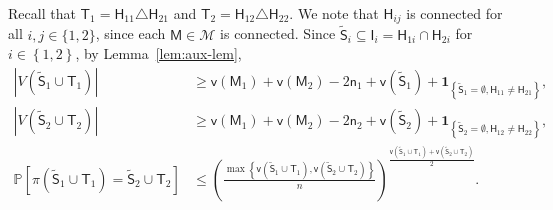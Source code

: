 \documentclass[letterpaper,11pt]{article}
\theoremstyle{definition}
\newcommand{\maM}{\mathcal{M}}
\newcommand{\prob}[1]{ \mathbb{P}\left[ #1 \right] }
\newcommand{\vn}{\mathsf{{v}}}
\newcommand{\pth}[1]{\left( #1 \right)}
\newcommand{\sth}[1]{\left\{ #1 \right\}}
\newcommand{\ti}{\tilde}
\newcommand{\sfH}{{\mathsf{H}}}
\newcommand{\sfI}{{\mathsf{I}}}
\newcommand{\sfM}{{\mathsf{M}}}
\newcommand{\sfS}{{\mathsf{S}}}
\newcommand{\sfT}{{\mathsf{T}}}
\newcommand{\sfn}{{\mathsf{n}}}
\newcommand{\indc}[1]{{\mathbf{1}_{\left\{{#1}\right\}}}}
\begin{document}
Recall that $\sfT_1 = \sfH_{11}\triangle \sfH_{21}$ and $\sfT_2 = \sfH_{12}\triangle \sfH_{22}$. 
We note that $\sfH_{ij}$ is connected for all $i,j \in \{1,2\}$, since each $\sfM \in \maM$ is connected.
Since $\ti{\sfS}_i\subseteq \sfI_i = \sfH_{1i}\cap \sfH_{2i}$ for $i\in \sth{1,2}$, by Lemma~\ref{lem:aux-lem},\begin{align*}
    |V(\ti{\sfS}_1\cup \sfT_1)|&\ge \vn(\sfM_1)+\vn(\sfM_2) -2\sfn_1+\vn(\ti{\sfS}_1)+\indc{\ti{\sfS}_1=\emptyset, \sfH_{11}\neq \sfH_{21}},\\
    |V(\ti{\sfS}_2\cup \sfT_2)|&\ge \vn(\sfM_1)+\vn(\sfM_2)-2\sfn_2+\vn(\ti{\sfS}_2)+\indc{\ti{\sfS}_2=\emptyset, \sfH_{12}\neq \sfH_{22}},\\
    \prob{\pi(\ti{\sfS}_1\cup \sfT_1) = \ti{\sfS}_2\cup \sfT_2}&\le \pth{\frac{\max\sth{\vn(\ti{\sfS}_1\cup \sfT_1),\vn(\ti{\sfS}_2\cup \sfT_2)}}{n}}^{\frac{\vn(\ti{\sfS}_1\cup \sfT_1)+\vn(\ti{\sfS}_2\cup \sfT_2)}{2}}.
\end{align*}   
\end{document}
